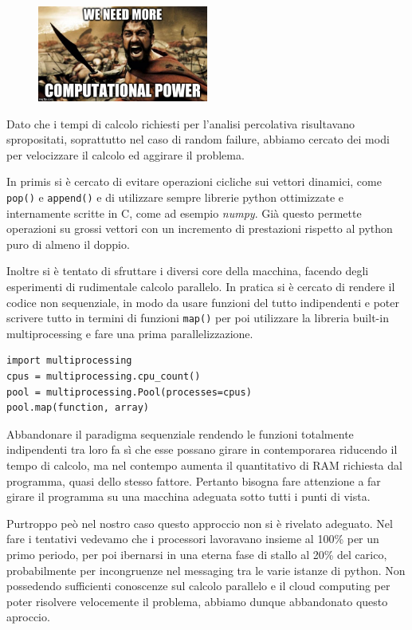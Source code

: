 \begin{figure}[ht!]
	\centering
	\includegraphics[width=0.5\textwidth]{./Immagini/Attack/meme_Leonida.jpg}
\end{figure}

Dato che i tempi di calcolo richiesti per l'analisi percolativa risultavano spropositati, soprattutto nel caso di random failure, abbiamo cercato dei modi per velocizzare il calcolo ed aggirare il problema.

In primis si è cercato di evitare operazioni cicliche sui vettori dinamici, come \lstinline{pop()} e \lstinline{append()} e di utilizzare sempre librerie python ottimizzate e internamente scritte in C, come ad esempio \emph{numpy}. Già questo permette operazioni su grossi vettori con un incremento di prestazioni rispetto al python puro di almeno il doppio.

Inoltre si è tentato di sfruttare i diversi core della macchina, facendo degli esperimenti di rudimentale calcolo parallelo. In pratica si è cercato di rendere il codice non sequenziale, in modo da usare funzioni del tutto indipendenti e poter scrivere tutto in termini di funzioni \lstinline{map()} per poi utilizzare la libreria built-in multiprocessing e fare una prima parallelizzazione. 

\begin{lstlisting}
import multiprocessing
cpus = multiprocessing.cpu_count()
pool = multiprocessing.Pool(processes=cpus)
pool.map(function, array)
\end{lstlisting}

Abbandonare il paradigma sequenziale rendendo le funzioni totalmente indipendenti tra loro fa sì che esse possano girare in contemporarea riducendo il tempo di calcolo, ma nel contempo aumenta il quantitativo di RAM richiesta dal programma, quasi dello stesso fattore. Pertanto bisogna fare attenzione a far girare il programma su una macchina adeguata sotto tutti i punti di vista.

Purtroppo peò nel nostro caso questo approccio non si è rivelato adeguato. Nel fare i tentativi vedevamo che i processori lavoravano insieme al 100\% per un primo periodo, per poi ibernarsi in una eterna fase di stallo al 20\% del carico, probabilmente per incongruenze nel messaging tra le varie istanze di python. Non possedendo sufficienti conoscenze sul calcolo parallelo e il cloud computing per poter risolvere velocemente il problema, abbiamo dunque abbandonato questo aproccio.

